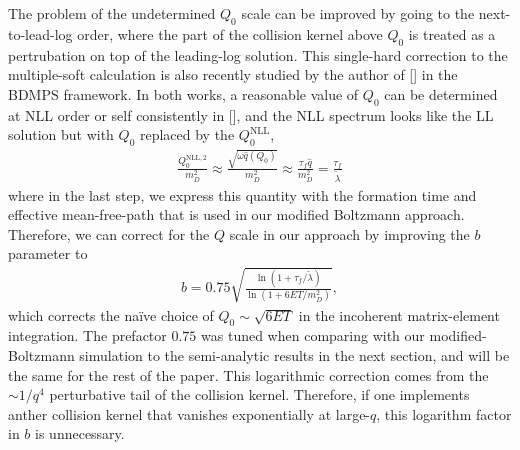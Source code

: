 \documentclass[aps, prc, reprint, amsmath, groupedaddress, nofootinbib]{revtex4-1}
\begin{document}
The problem of the undetermined $Q_0$ scale can be improved by going to the next-to-lead-log order, where the part of the collision kernel above $Q_0$ is treated as a pertrubation on top of the leading-log solution.
This single-hard correction to the multiple-soft calculation is also recently studied by the author of [] in the BDMPS framework.
In both works, a reasonable value of $Q_0$ can be determined at NLL order or self consistently in [], and the NLL spectrum looks like the LL solution but with $Q_0$ replaced by the $Q_{0}^{\textrm{NLL}}$,
\begin{eqnarray}
\frac{Q_{0}^{\textrm{NLL},2}}{m_D^2} \approx \frac{\sqrt{\omega \hat{q}(Q_0)}}{m_D^2} \approx \frac{\tau_f \hat{q}}{m_D^2} = \frac{\tau_f}{\tilde{\lambda}}
\end{eqnarray}
where in the last step, we express this quantity with the formation time and effective mean-free-path that is used in our modified Boltzmann approach.
Therefore, we can correct for the $Q$ scale in our approach by improving the $b$ parameter to 
\begin{eqnarray}
b = 0.75\sqrt{\frac{\ln\left(1+\tau_f/\tilde{\lambda}\right)}{\ln\left(1+6ET/m_D^2\right)}},
\end{eqnarray}
which corrects the na\"ive choice of $Q_0 \sim \sqrt{6ET}$ in the incoherent matrix-element integration.
The prefactor $0.75$ was tuned when comparing with our modified-Boltzmann simulation to the semi-analytic results in the next section, and will be the same for the rest of the paper.
This logarithmic correction comes from the $\sim 1/q^4$ perturbative tail of the collision kernel.
Therefore, if one implements anther collision kernel that vanishes exponentially at large-$q$, this logarithm factor in $b$ is unnecessary. 
\end{document}
